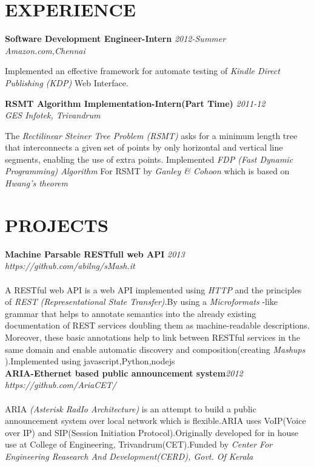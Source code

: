 \documentclass[line,margin]{res}
\begin{document}
\begin{resume}
  \section{EXPERIENCE}
  \textbf{ Software Development Engineer-Intern }\hfill \textit{2012-Summer } \\
  \textit{Amazon.com,Chennai }

  Implemented an effective framework for automate testing of \textit{Kindle Direct Publishing (KDP)} Web Interface.

  \textbf{ RSMT Algorithm Implementation-Intern(Part Time) }\hfill\textit{2011-12} \\
  \textit{GES Infotek, Trivandrum }

  The \textit{Rectilinear Steiner Tree Problem (RSMT)} asks for a minimum length tree that interconnects a given set of points by only horizontal and vertical line segments, enabling the use of extra points. Implemented \textit{FDP (Fast Dynamic Programming) Algorithm } For RSMT by \textit{Ganley \& Cohoon } which is based on \textit{Hwang’s theorem}\\

  \pagebreak
  \section{PROJECTS}
  \textbf{ Machine Parsable RESTfull web API }\hfill \textit{2013}\\
  \textit{https://github.com/abilng/sMash.it}\\\\
  A RESTful web API is a web API implemented using \textit{HTTP }and the principles of \textit{REST (Representational State Transfer)}.By using  a \textit{Microformats }-like grammar that helps to annotate semantics into the already existing documentation of REST services doubling them as machine-readable descriptions. Moreover, these basic annotations help to link between RESTful services in the same domain and enable automatic discovery and composition(creating \textit{Mashups }).Implemented using javascript,Python,nodejs\\

  \textbf{ ARIA-Ethernet based public announcement system}\hfill \textit{2012}\\
  \textit{https://github.com/AriaCET/}\\\\
  ARIA \textit{(Asterisk RadIo Architecture)} is an attempt to build a public announcement system over local network which is flexible.ARIA uses VoIP(Voice over IP) and SIP(Session Initiation Protocol).Originally developed for in house use at College of Engineering, Trivandrum(CET).Funded by \textit{Center For Engineering Reasearch And Development(CERD), Govt. Of Kerala}\\



\end{resume}
\end{document}
